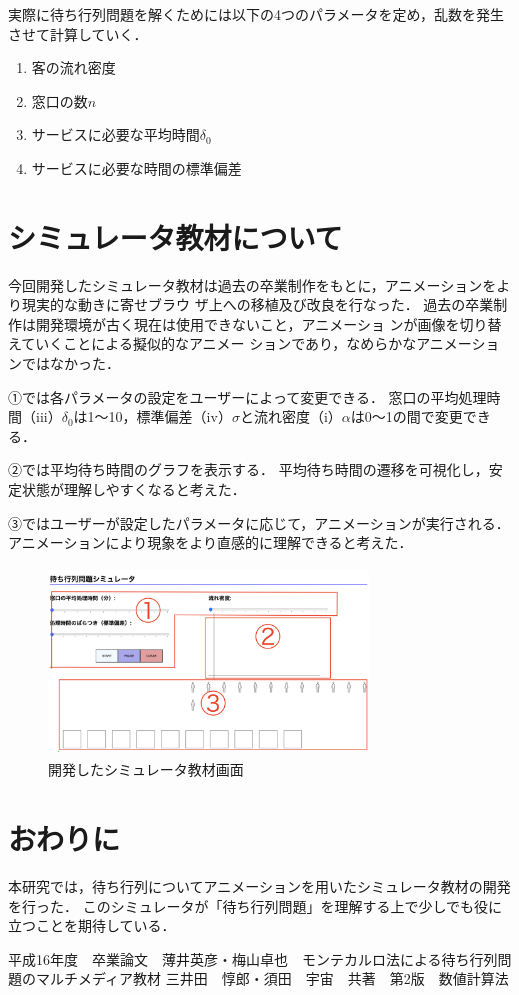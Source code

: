 \documentclass[twocolumn,10pt,a4j]{ltjsarticle}
\begin{document}
実際に待ち行列問題を解くためには以下の4つのパラメータを定め，乱数を発生させて計算していく．
\begin{enumerate}
\renewcommand{\labelenumi}{(\roman{enumi})}
\item 客の流れ密度\alpha
\item 窓口の数$n$
\item サービスに必要な平均時間$\delta_0$
\item サービスに必要な時間の標準偏差\sigma
\end{enumerate}


\section{シミュレータ教材について}
今回開発したシミュレータ教材は過去の卒業制作をもとに，アニメーションをより現実的な動きに寄せブラウ ザ上への移植及び改良を行なった．
過去の卒業制作は開発環境が古く現在は使用できないこと，アニメーショ ンが画像を切り替えていくことによる擬似的なアニメー ションであり，なめらかなアニメーションではなかった．

①では各パラメータの設定をユーザーによって変更できる．
窓口の平均処理時間（iii）$\delta_0$は1〜10，標準偏差（iv）$\sigma$と流れ密度（i）$\alpha$は0〜1の間で変更できる．

②では平均待ち時間のグラフを表示する．
平均待ち時間の遷移を可視化し，安定状態が理解しやすくなると考えた．

③ではユーザーが設定したパラメータに応じて，アニメーションが実行される．
アニメーションにより現象をより直感的に理解できると考えた．

\begin{figure}[h]
\begin{center}
\includegraphics[clip,width=85mm,height=50mm]{figures/layout_ex.pdf}
\end{center}
\caption{開発したシミュレータ教材画面}
\label{fig:教科書}
\end{figure}

\section{おわりに}
本研究では，待ち行列についてアニメーションを用いたシミュレータ教材の開発を行った．
このシミュレータが「待ち行列問題」を理解する上で少しでも役に立つことを期待している．
\begin{thebibliography}{99}
平成16年度　卒業論文　薄井英彦・梅山卓也　モンテカルロ法による待ち行列問題のマルチメディア教材
 三井田　惇郎・須田　宇宙　共著　第2版　数値計算法　
 \end{thebibliography}
\end{document}
